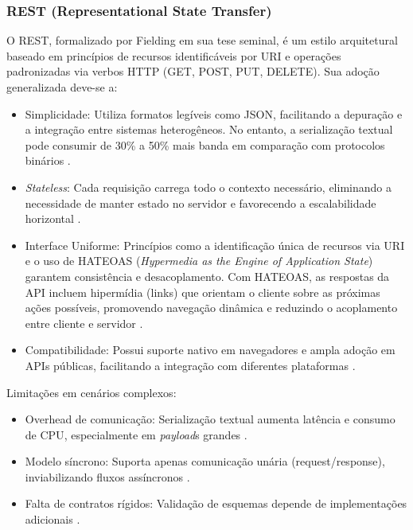 \subsubsection{\texorpdfstring{\gls{REST}}{REST} (Representational State Transfer)}
O \gls{REST}, formalizado por Fielding \cite{fielding2000rest} em sua tese seminal, é um estilo arquitetural baseado em princípios de recursos identificáveis por \gls{URI} e operações padronizadas via verbos \gls{HTTP} (GET, POST, PUT, DELETE). Sua adoção generalizada deve-se a:

\begin{itemize}
    \item Simplicidade: Utiliza formatos legíveis como \gls{JSON}, facilitando a depuração e a integração entre sistemas heterogêneos. No entanto, a serialização textual pode consumir de 30\% a 50\% mais banda em comparação com protocolos binários \cite{niswar2023performance}.
    \item \textit{Stateless}: Cada requisição carrega todo o contexto necessário, eliminando a necessidade de manter estado no servidor e favorecendo a escalabilidade horizontal \cite{fielding2000rest}.
    \item Interface Uniforme: Princípios como a identificação única de recursos via URI e o uso de HATEOAS (\textit{Hypermedia as the Engine of Application State}) garantem consistência e desacoplamento. Com HATEOAS, as respostas da API incluem hipermídia (links) que orientam o cliente sobre as próximas ações possíveis, promovendo navegação dinâmica e reduzindo o acoplamento entre cliente e servidor \cite{maso2024comparativo}.
    \item Compatibilidade: Possui suporte nativo em navegadores e ampla adoção em APIs públicas, facilitando a integração com diferentes plataformas \cite{maso2024comparativo}.
\end{itemize}

Limitações em cenários complexos:
\begin{itemize}
\item Overhead de comunicação: Serialização textual aumenta latência e consumo de \gls{CPU}, especialmente em \textit{payload}s grandes \cite{niswar2023performance}.
\item Modelo síncrono: Suporta apenas comunicação unária (request/response), inviabilizando fluxos assíncronos \cite{niswar2023performance}.
\item Falta de contratos rígidos: Validação de esquemas depende de implementações adicionais \cite{maso2024comparativo}.
\end{itemize}

